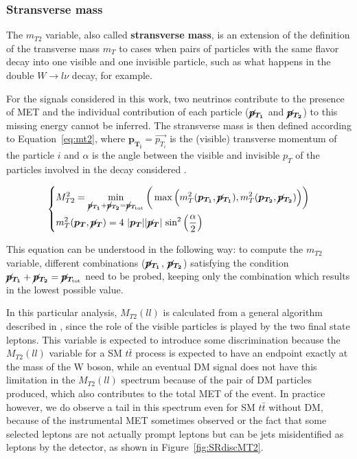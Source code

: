 \documentclass[a4paper, 10pt, openright]{report}
\begin{document}
\subsubsection*{Stransverse mass}

The $m_{T2}$ variable, also called \textbf{stransverse mass}, is an extension of the definition of the transverse mass $m_T$ to cases when pairs of particles with the same flavor decay into one visible and one invisible particle, such as what happens in the double $W \rightarrow l\nu$ decay, for example. 

For the signals considered in this work, two neutrinos contribute to the presence of \ac{MET} and the individual contribution of each particle ($\bm{\cancel{p}_{T_{1}}}$ and $\bm{\cancel{p}_{T_2}}$) to this missing energy cannot be inferred. The stransverse mass is then defined according to Equation~\ref{eq:mt2}, where $\bm{p_{T_i}} = \overrightarrow{p_{T_i}}$ is the (visible) transverse momentum of the particle $i$ and $\alpha$ is the angle between the visible and invisible $p_T$ of the particles involved in the decay considered \cite{MT2}.

\begin{equation}
\label{eq:mt2}
\begin{dcases}
M_{T2}^2 = \min_{\bm{\cancel{p}_{T_{1}}} + \bm{\cancel{p}_{T_{2}}} = \bm{\cancel{p}_{T_{\text{tot}}}}} \bigg (\max \Big (m_T^2(\bm{p_{T_1}}, \bm{\cancel{p}_{T_{1}}}), m_T^2(\bm{p_{T_2}}, \bm{\cancel{p}_{T_{2}}}) \Big ) \bigg ) \\
m_T^2(\bm{p_{T}}, \bm{\cancel{p}_{T}}) = 4 \text{ } |\bm{p_{T}}| |\bm{\cancel{p}_{T}}| \text{ sin}^2 \left (\frac{\alpha}{2} \right ) 
\end{dcases}
\end{equation}

This equation can be understood in the following way: to compute the $m_{T2}$ variable, different combinations ($\bm{\cancel{p}_{T_{1}}}$, $\bm{\cancel{p}_{T_{2}}}$) satisfying the condition $\bm{\cancel{p}_{T_{1}}} + \bm{\cancel{p}_{T_{2}}} = \bm{\cancel{p}_{T_{\text{tot}}}}$ need to be probed, keeping only the combination which results in the lowest possible value.

In this particular analysis, $M_{T2}(ll)$ is calculated from a general algorithm described in \cite{MT2Calc}, since the role of the visible particles is played by the two final state leptons. This variable is expected to introduce some discrimination because the $M_{T2}(ll)$ variable for a \ac{SM} $t \bar t$ process is expected to have an endpoint exactly at the mass of the W boson, while an eventual \ac{DM} signal does not have this limitation in the $M_{T2}(ll)$ spectrum because of the pair of \ac{DM} particles produced, which also contributes to the total \ac{MET} of the event. In practice however, we do observe a tail in this spectrum even for \ac{SM} $t \bar t$ without \ac{DM}, because of the instrumental \ac{MET} sometimes observed or the fact that some selected leptons are not actually prompt leptons but can be jets misidentified as leptons by the detector, as shown in Figure~\ref{fig:SRdiscMT2}.
\end{document}

